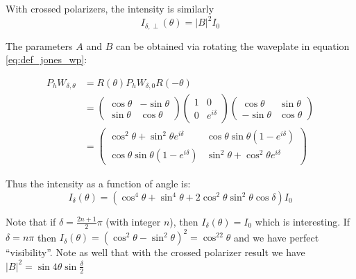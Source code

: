 \documentclass{article}
\begin{document}
With crossed polarizers, the intensity is similarly
\begin{equation}
    \label{eq:calpol_intense_crossed}
    I_{\delta,\perp}(\theta) = \vert B\vert^2I_0
\end{equation}

The parameters $A$ and $B$ can be obtained via rotating the waveplate in equation \ref{eq:def_jones_wp}:

\begin{align}
    \label{eq:rot_wp}
    P_hW_{\delta,\theta} &= R(\theta)P_h W_{\delta,0} R(-\theta) \nonumber \\
                         &= 
                         \begin{pmatrix}
                             \cos\theta & -\sin\theta \\ 
                             \sin\theta & \cos\theta
                         \end{pmatrix}
                         \begin{pmatrix}
                             1 & 0 \\ 
                             0 & e^{i\delta}
                         \end{pmatrix} 
                         \begin{pmatrix}
                             \cos\theta & \sin\theta \\ 
                             -\sin\theta & \cos\theta
                         \end{pmatrix} \nonumber \\
                         & = \begin{pmatrix}
                             \cos^2\theta + \sin^2\theta e^{i\delta} & \cos\theta\sin\theta\left(1-e^{i\delta}\right)\\ 
                             \cos\theta\sin\theta\left(1-e^{i\delta}\right) &\sin^2\theta + \cos^2\theta e^{i\delta}
                         \end{pmatrix} 
\end{align}

\noindent Thus the intensity as a function of angle is:
\begin{equation}
    \label{eq:calpol_intense_mark2}
    I_{\delta}(\theta) = \left(\cos^4\theta + \sin^4\theta + 2\cos^2\theta\sin^2\theta\cos\delta\right)I_0
\end{equation}

\noindent Note that if $\delta = \frac{2n+1}{2}\pi$ (with integer $n$), then $I_{\delta}(\theta) = I_0$ which is interesting. If $\delta = n\pi$ then $I_{\delta}(\theta) = \left(\cos^2\theta - \sin^2\theta\right)^2 = \cos^22\theta$ and we have perfect ``visibility''. Note as well that with the crossed polarizer result we have $\vert B\vert^2 = \sin4\theta\sin\frac{\delta}{2}$
\end{document}
